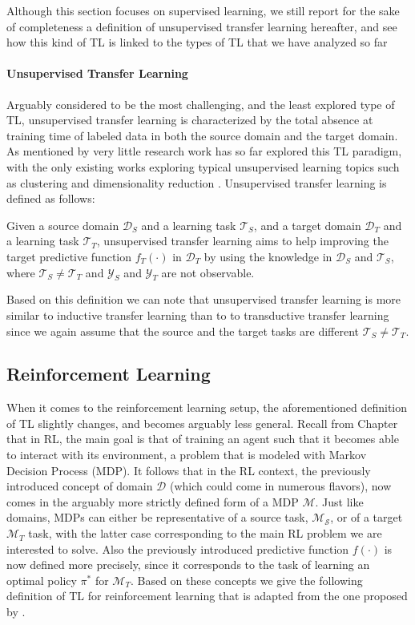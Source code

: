 Although this section focuses on supervised learning, we still report for the sake of completeness a definition of unsupervised transfer learning hereafter, and see how this kind of TL is linked to the types of TL that we have analyzed so far

\paragraph{Unsupervised Transfer Learning}
Arguably considered to be the most challenging, and the least explored type of TL, unsupervised transfer learning is characterized by the total absence at training time of labeled data in both the source domain and the target domain. As mentioned by \citet{pan2009survey} very little research work has so far explored this TL paradigm, with the only existing works exploring typical unsupervised learning topics such as clustering \cite{dai2008self, jin2011transferring, qian2015cluster} and dimensionality reduction \cite{wang2008transferred, zhu2013self, zhu2016robust}. Unsupervised transfer learning is defined as follows:
\begin{definition}
	Given a source domain $\mathcal{D}_S$ and a learning task $\mathcal{T}_S$, and a target domain $\mathcal{D}_T$ and a learning task $\mathcal{T}_T$, unsupervised transfer learning aims to help improving the target predictive function $f_T(\cdot)$ in $\mathcal{D}_T$ by using the knowledge in $\mathcal{D}_S$ and $\mathcal{T}_S$, where $\mathcal{T}_S \neq \mathcal{T}_T$ and $\mathcal{Y}_S$ and $\mathcal{Y}_T$ are not observable. 
\end{definition}
Based on this definition we can note that unsupervised transfer learning is more similar to inductive transfer learning than to to transductive transfer learning since we again assume that the source and the target tasks are different $\mathcal{T}_S \neq \mathcal{T}_T$.


\subsection{Reinforcement Learning}
When it comes to the reinforcement learning setup, the aforementioned definition of TL slightly changes, and becomes arguably less general. Recall from Chapter \label{ch:reinforcement_learning} that in RL, the main goal is that of training an agent such that it becomes able to interact with its environment, a problem that is modeled with Markov Decision Process (MDP). It follows that in the RL context, the previously introduced concept of domain $\mathcal{D}$ (which could come in numerous flavors), now comes in the arguably more strictly defined form of a MDP $\mathcal{M}$. Just like domains, MDPs can either be representative of a source task, $\mathcal{M_S}$, or of a target $\mathcal{M}_T$ task, with the latter case corresponding to the main RL problem we are interested to solve. Also the previously introduced predictive function $f(\cdot)$ is now defined more precisely, since it corresponds to the task of learning an optimal policy $\pi^*$ for $\mathcal{M}_T$. Based on these concepts we give the following definition of TL for reinforcement learning that is adapted from the one proposed by \citet{zhu2020transfer}.

